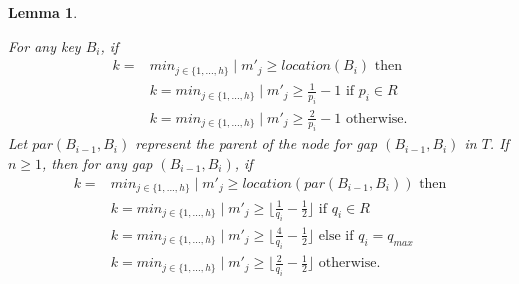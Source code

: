 \documentclass[letterpaper,12pt,titlepage,oneside,final]{book}
\theoremstyle{plain}
\newtheorem{lem}[thm]{Lemma}
\begin{document}
\begin{lem} \label{locationLemBST}

For any key $B_i$, if
\begin{align*}
k=&min_{j \in \{1, ..., h\}} \mid m'_j \geq location(B_i) \text{ then} \\
&k=min_{j \in \{1, ..., h\}} \mid m'_j \geq \frac{1}{p_i}-1 \text{ if } p_i \in R \\
&k=min_{j \in \{1, ..., h\}} \mid m'_j \geq \frac{2}{p_i}-1 \text{ otherwise.}
\end{align*}
Let $par(B_{i-1}, B_i)$ represent the parent of the node for gap $(B_{i-1}, B_i)$ in $T$. If $n \geq 1$, then for any gap $(B_{i-1}, B_i)$, if 
\begin{align*}
k=&min_{j \in \{1, ..., h\}} \mid m'_j \geq location(par(B_{i-1}, B_i)) \text{ then} \\
&k=min_{j \in \{1, ..., h\}} \mid m'_j \geq \lfloor \frac{1}{q_i}-\frac{1}{2} \rfloor \text{ if } q_i \in R \\
&k=min_{j \in \{1, ..., h\}} \mid m'_j \geq \lfloor \frac{4}{q_i}-\frac{1}{2} \rfloor \text{ else if } q_i = q_{max} \\
&k=min_{j \in \{1, ..., h\}} \mid m'_j \geq \lfloor \frac{2}{q_i}-\frac{1}{2} \rfloor \text{ otherwise}.
\end{align*}

\end{lem}
\end{document}
